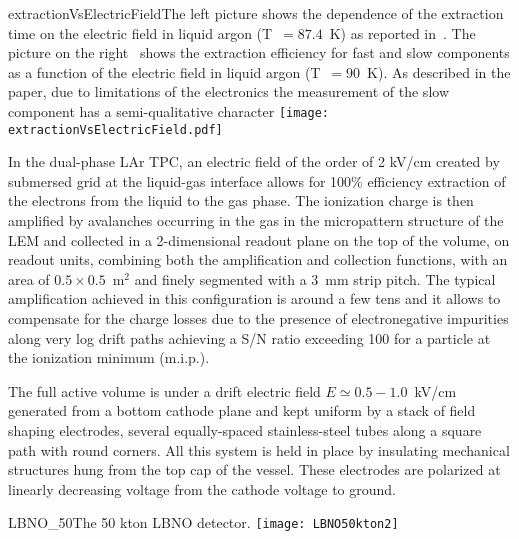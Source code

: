 \begin{cdrfigure}{extractionVsElectricField}{The left picture shows the dependence of the extraction time on the electric field in liquid argon (T~$= 87.4$~K) as reported in~\cite{Borghesani1990}.
The picture on the right~\cite{Gushchin1982b} shows the extraction efficiency for fast and slow components as a function of the electric field in liquid argon (T~$= 90$~K). As described in the paper, due to limitations of the electronics the measurement of the slow component has a semi-qualitative character}
\texttt{[image: extractionVsElectricField.pdf]}
\end{cdrfigure}

In the dual-phase LAr TPC, an electric field of the order of 2 kV/cm created by submersed grid at the liquid-gas interface allows for 100\% efficiency extraction of the electrons from the liquid to the gas phase. The ionization charge is then amplified by avalanches occurring in the gas in the micropattern structure of the LEM and collected in a 2-dimensional readout plane on the top of the volume, on readout units, combining both the amplification and collection functions, with an area of $0.5\times 0.5$~m$^2$ and finely segmented with a 3~mm strip pitch. The typical amplification achieved in this configuration is around a few tens and it allows to compensate for the charge losses due to the presence of electronegative impurities along very log drift paths achieving a S/N ratio exceeding 100 for a particle at the ionization minimum (m.i.p.).

The full active volume  is under a drift electric field  $E{\simeq} 0.5-1.0$~kV/cm generated from a bottom cathode plane and kept uniform by a stack of field shaping electrodes, several equally-spaced stainless-steel tubes along a square path with round corners. All this system is held in place by insulating mechanical structures hung from the top cap of the vessel. These electrodes are polarized at linearly decreasing voltage from the cathode voltage to ground. 


\begin{cdrfigure}{LBNO_50}{The 50 kton LBNO detector.}
\texttt{[image: LBNO50kton2]}
\end{cdrfigure}

